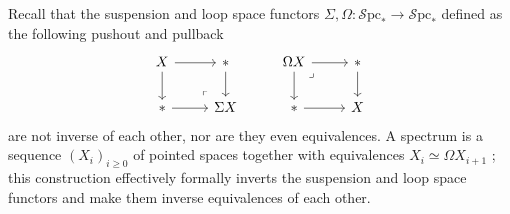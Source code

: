 \documentclass[11pt]{article}
\theoremstyle{definition}
\newcommand{\Spc}{\mathcal{S}\mathrm{pc}}
\begin{document}
Recall that the suspension and loop space functors $\Sigma, \Omega : \Spc_* \to \Spc_*$ defined as the following pushout and pullback
\[\begin{tikzcd}
	X & {*} & {\Omega X} & {*} \\
	{*} & {\Sigma X} & {*} & X
	\arrow[from=1-1, to=1-2]
	\arrow[from=1-1, to=2-1]
	\arrow[from=1-2, to=2-2]
	\arrow[from=1-3, to=1-4]
	\arrow[from=1-3, to=2-3]
	\arrow["\lrcorner"{anchor=center, pos=0.125}, draw=none, from=1-3, to=2-4]
	\arrow[from=1-4, to=2-4]
	\arrow[from=2-1, to=2-2]
	\arrow["\lrcorner"{anchor=center, pos=0.125, rotate=180}, draw=none, from=2-2, to=1-1]
	\arrow[from=2-3, to=2-4]
\end{tikzcd}\]
are not inverse of each other, nor are they even equivalences.
A spectrum is a sequence $(X_i)_{i \geqslant 0}$ of pointed spaces together with equivalences $X_i \simeq \Omega X_{i+1}$ ; this construction effectively formally inverts the suspension and loop space functors and make them inverse equivalences of each other.
\end{document}

